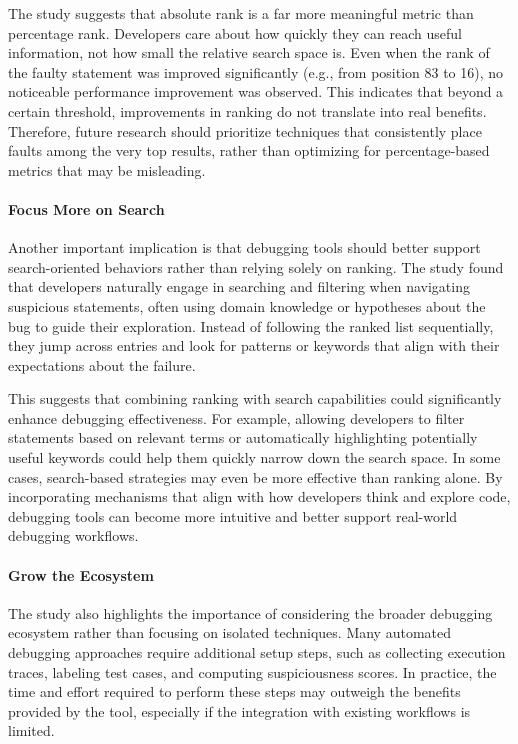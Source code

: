 The study suggests that absolute rank is a far more meaningful metric than percentage rank. Developers care about how quickly they can reach useful information, not how small the relative search space is. Even when the rank of the faulty statement was improved significantly (e.g., from position 83 to 16), no noticeable performance improvement was observed. This indicates that beyond a certain threshold, improvements in ranking do not translate into real benefits. Therefore, future research should prioritize techniques that consistently place faults among the very top results, rather than optimizing for percentage-based metrics that may be misleading.

\paragraph{Focus More on Search}

Another important implication is that debugging tools should better support search-oriented behaviors rather than relying solely on ranking. The study found that developers naturally engage in searching and filtering when navigating suspicious statements, often using domain knowledge or hypotheses about the bug to guide their exploration. Instead of following the ranked list sequentially, they jump across entries and look for patterns or keywords that align with their expectations about the failure.

This suggests that combining ranking with search capabilities could significantly enhance debugging effectiveness. For example, allowing developers to filter statements based on relevant terms or automatically highlighting potentially useful keywords could help them quickly narrow down the search space. In some cases, search-based strategies may even be more effective than ranking alone. By incorporating mechanisms that align with how developers think and explore code, debugging tools can become more intuitive and better support real-world debugging workflows.

\paragraph{Grow the Ecosystem}

The study also highlights the importance of considering the broader debugging ecosystem rather than focusing on isolated techniques. Many automated debugging approaches require additional setup steps, such as collecting execution traces, labeling test cases, and computing suspiciousness scores. In practice, the time and effort required to perform these steps may outweigh the benefits provided by the tool, especially if the integration with existing workflows is limited.

